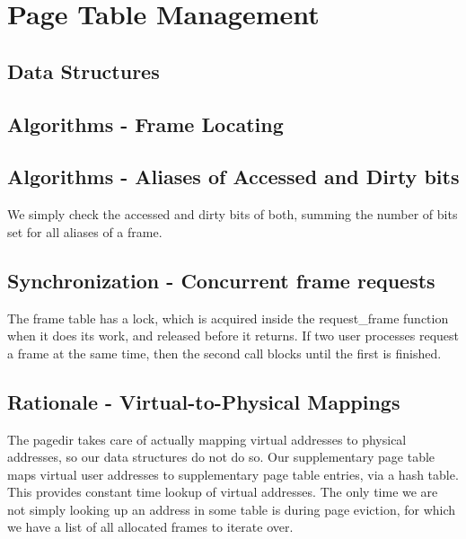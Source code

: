 \section{Page Table Management}

\subsection{Data Structures}


\subsection{Algorithms - Frame Locating}


\subsection{Algorithms - Aliases of Accessed and Dirty bits}


We simply check the accessed and dirty bits of both, summing the number of bits
set for all aliases of a frame.

\subsection{Synchronization - Concurrent frame requests}


The frame table has a lock, which is acquired inside the request\_frame
function when it does its work, and released before it returns. If two user
processes request a frame at the same time, then the second call blocks
until the first is finished.

\subsection{Rationale - Virtual-to-Physical Mappings}


The pagedir takes care of actually mapping virtual addresses to physical
addresses, so our data structures do not do so. Our supplementary page table
maps virtual user addresses to supplementary page table entries, via a hash
table. This provides constant time lookup of virtual addresses. The only
time we are not simply looking up an address in some table is during page
eviction, for which we have a list of all allocated frames to iterate over.
